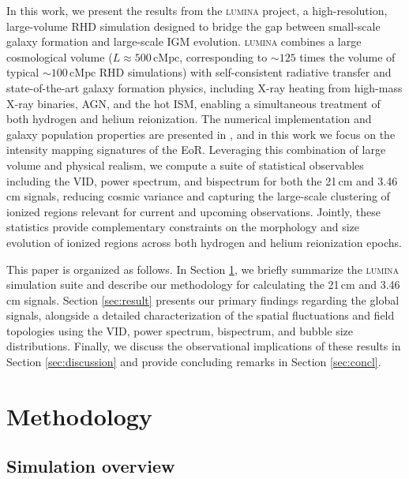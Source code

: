 \documentclass[apj,twocolumn, appendixfloats, twocolappendix, numberedappendix, tighten]{openjournal}
\DeclareRobustCommand{\lumina}{\mbox{\textsc{lumina}}\xspace}
\begin{document}
In this work, we present the results from the \lumina project, a high-resolution, large-volume RHD simulation designed to bridge the gap between small-scale galaxy formation and large-scale IGM evolution. \lumina combines a large cosmological volume ($L \approx 500\,\mathrm{cMpc}$, corresponding to $\sim 125$ times the volume of typical $\sim 100\,\mathrm{cMpc}$ RHD simulations) with self-consistent radiative transfer and state-of-the-art galaxy formation physics, including X-ray heating from high-mass X-ray binaries, AGN, and the hot ISM, enabling a simultaneous treatment of both hydrogen and helium reionization. The numerical implementation and galaxy population properties are presented in \citet{Zier2026}, and in this work we focus on the intensity mapping signatures of the EoR. Leveraging this combination of large volume and physical realism, we compute a suite of statistical observables including the VID, power spectrum, and bispectrum for both the 21\,cm and 3.46\,cm signals, reducing cosmic variance and capturing the large-scale clustering of ionized regions relevant for current and upcoming observations. Jointly, these statistics provide complementary constraints on the morphology and size evolution of ionized regions across both hydrogen and helium reionization epochs.


This paper is organized as follows. In Section \ref{sec:lumina}, we briefly summarize the \lumina simulation suite and describe our methodology for calculating the 21\,cm and 3.46\,cm signals. Section \ref{sec:result} presents our primary findings regarding the global signals, alongside a detailed characterization of the spatial fluctuations and field topologies using the VID, power spectrum, bispectrum, and bubble size distributions. Finally, we discuss the observational implications of these results in Section \ref{sec:discussion} and provide concluding remarks in Section \ref{sec:concl}.



\section{Methodology}
\label{sec:lumina}

\subsection{Simulation overview}
\end{document}
